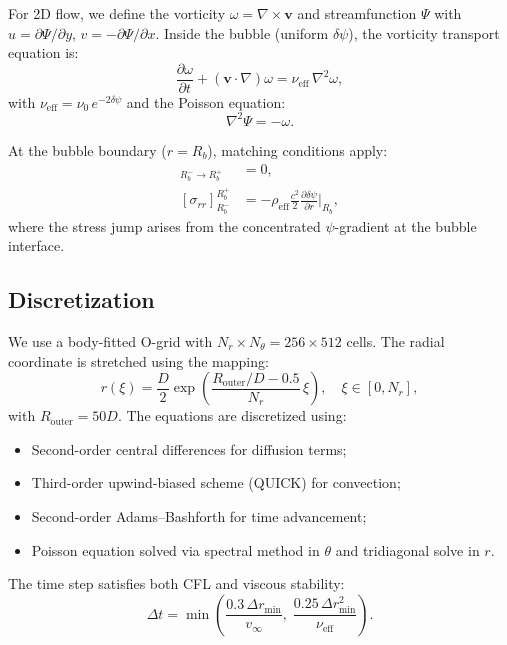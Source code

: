 \documentclass[12pt,twocolumn]{article}
\newcommand{\Reff}{\mathrm{eff}}
\newcommand{\vvec}{\mathbf{v}}
\newcommand{\dpsi}{\delta\psi}
\begin{document}
For 2D flow, we define the vorticity $\omega = \nabla\times\vvec$ and
streamfunction $\Psi$ with $u = \partial\Psi/\partial y$,
$v = -\partial\Psi/\partial x$. Inside the bubble (uniform $\dpsi$),
the vorticity transport equation is:
\begin{equation}
\frac{\partial\omega}{\partial t} + (\vvec\cdot\nabla)\omega
= \nu_\Reff\,\nabla^2\omega,
\label{eq:vorticity}
\end{equation}
with $\nu_\Reff = \nu_0\,e^{-2\dpsi}$ and the Poisson equation:
\begin{equation}
\nabla^2\Psi = -\omega.
\label{eq:poisson}
\end{equation}

At the bubble boundary ($r = R_b$), matching conditions apply:
\begin{align}
[\vvec]_{R_b^- \to R_b^+} &= 0, \label{eq:match_v}\\
[\sigma_{rr}]_{R_b^-}^{R_b^+} &= -\rho_\Reff\frac{c^2}{2}
\frac{\partial\dpsi}{\partial r}\Bigg|_{R_b}, \label{eq:match_stress}
\end{align}
where the stress jump arises from the concentrated $\psi$-gradient at
the bubble interface.

\subsection{Discretization}

We use a body-fitted O-grid with $N_r \times N_\theta = 256 \times 512$
cells. The radial coordinate is stretched using the mapping:
\begin{equation}
r(\xi) = \frac{D}{2}\exp\!\left(\frac{R_\mathrm{outer}/D - 0.5}
{N_r}\,\xi\right), \quad \xi \in [0, N_r],
\end{equation}
with $R_\mathrm{outer} = 50D$. The equations are discretized using:
\begin{itemize}[noitemsep]
\item Second-order central differences for diffusion terms;
\item Third-order upwind-biased scheme (QUICK) for convection;
\item Second-order Adams--Bashforth for time advancement;
\item Poisson equation solved via spectral method in $\theta$ and
  tridiagonal solve in $r$.
\end{itemize}

The time step satisfies both CFL and viscous stability:
\begin{equation}
\Delta t = \min\!\left(\frac{0.3\,\Delta r_\mathrm{min}}{v_\infty},\;
\frac{0.25\,\Delta r_\mathrm{min}^2}{\nu_\Reff}\right).
\end{equation}
\end{document}
